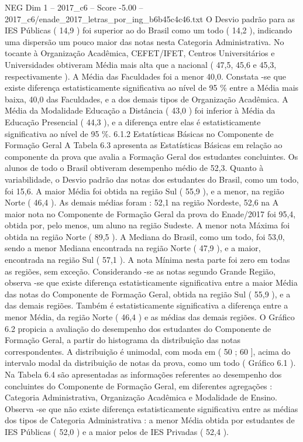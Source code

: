 \begin{textsample}{NEG Dim 1 – 2017\_c6 – Score -5.00 – 2017\_c6/enade\_2017\_letras\_por\_ing\_b6b45c4c46.txt}
O Desvio padrão para as IES Públicas ( 14,9 ) foi superior ao do Brasil como um todo ( 14,2 ), indicando uma dispersão um pouco maior das notas nesta Categoria Administrativa.
No tocante à Organização Acadêmica, CEFET/IFET, Centros Universitários e Universidades obtiveram Média mais alta que a nacional ( 47,5, 45,6 e 45,3, respectivamente ).
A Média das Faculdades foi a menor 40,0.
Constata -se que existe diferença estatisticamente significativa ao nível de 95 \% entre a Média mais baixa, 40,0 das Faculdades, e a dos demais tipos de Organização Acadêmica.
A Média da Modalidade Educação a Distância ( 43,0 ) foi inferior à Média da Educação Presencial ( 44,3 ), e a diferença entre elas é estatisticamente significativa ao nível de 95 \%. 6.1.2 Estatísticas Básicas no Componente de Formação Geral A Tabela 6.3 apresenta as Estatísticas Básicas em relação ao componente da prova que avalia a Formação Geral dos estudantes concluintes.
Os alunos de todo o Brasil obtiveram desempenho médio de 52,3.
Quanto à variabilidade, o Desvio padrão das notas dos estudantes do Brasil, como um todo, foi 15,6.
A maior Média foi obtida na região Sul ( 55,9 ), e a menor, na região Norte ( 46,4 ).
As demais médias foram : 52,1 na região Nordeste, 52,6 na A maior nota no Componente de Formação Geral da prova do Enade/2017 foi 95,4, obtida por, pelo menos, um aluno na região Sudeste.
A menor nota Máxima foi obtida na região Norte ( 89,5 ).
A Mediana do Brasil, como um todo, foi 53,0, sendo a menor Mediana encontrada na região Norte ( 47,9 ), e a maior, encontrada na região Sul ( 57,1 ).
A nota Mínima nesta parte foi zero em todas as regiões, sem exceção.
Considerando -se as notas segundo Grande Região, observa -se que existe diferença estatisticamente significativa entre a maior Média das notas do Componente de Formação Geral, obtida na região Sul ( 55,9 ), e a das demais regiões.
Também é estatisticamente significativa a diferença entre a menor Média, da região Norte ( 46,4 ) e as médias das demais regiões.
O Gráfico 6.2 propicia a avaliação do desempenho dos estudantes do Componente de Formação Geral, a partir do histograma da distribuição das notas correspondentes.
A distribuição é unimodal, com moda em ( 50 ; 60 ], acima do intervalo modal da distribuição de notas da prova, como um todo ( Gráfico 6.1 ).
Na Tabela 6.4 são apresentadas as informações referentes ao desempenho dos concluintes do Componente de Formação Geral, em diferentes agregações : Categoria Administrativa, Organização Acadêmica e Modalidade de Ensino.
Observa -se que não existe diferença estatisticamente significativa entre as médias dos tipos de Categoria Administrativa : a menor Média obtida por estudantes de IES Públicas ( 52,0 ) e a maior pelos de IES Privadas ( 52,4 ).

\end{textsample}
